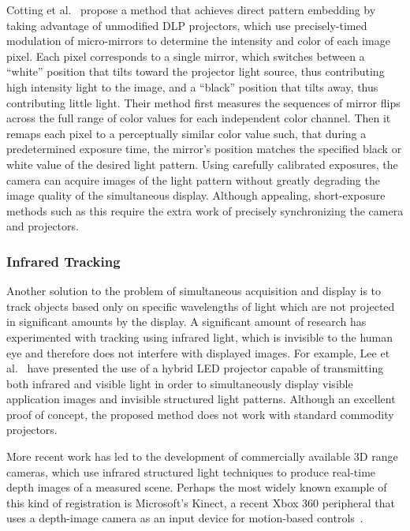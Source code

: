 \documentclass{thesis}
\begin{document}
Cotting et al.~\cite{Cotting2004} propose a method that achieves direct pattern embedding by taking advantage of unmodified DLP projectors, which use precisely-timed modulation of micro-mirrors to determine the intensity and color of each image pixel. Each pixel corresponds to a single mirror, which switches between a ``white'' position that tilts toward the projector light source, thus contributing high intensity light to the image, and a ``black'' position that tilts away, thus contributing little light. Their method first measures the sequences of mirror flips across the full range of color values for each independent color channel. Then it remaps each pixel to a perceptually similar color value such, that during a predetermined exposure time, the mirror's position matches the specified black or white value of the desired light pattern. Using carefully calibrated exposures, the camera can acquire images of the light pattern without greatly degrading the image quality of the simultaneous display. Although appealing, short-exposure methods such as this require the extra work of precisely synchronizing the camera and projectors.

\subsubsection{Infrared Tracking}

Another solution to the problem of simultaneous acquisition and display is to track objects based only on specific wavelengths of light which are not projected in significant amounts by the display. A significant amount of research has experimented with tracking using infrared light, which is invisible to the human eye and therefore does not interfere with displayed images. For example, Lee et al.~\cite{Lee2007} have presented the use of a hybrid LED projector capable of transmitting both infrared and visible light in order to simultaneously display visible application images and invisible structured light patterns. Although an excellent proof of concept, the proposed method does not work with standard commodity projectors.

More recent work has led to the development of commercially available 3D range cameras, which use infrared structured light techniques to produce real-time depth images of a measured scene. Perhaps the most widely known example of this kind of registration is Microsoft's Kinect, a recent Xbox 360 peripheral that uses a depth-image camera as an input device for motion-based controls~\cite{Kinect, Shotton2011}.
\end{document}
